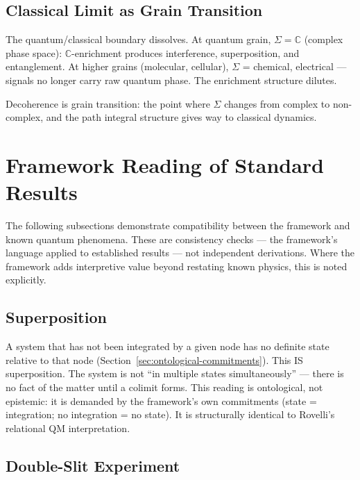 \documentclass[12pt,a4paper]{article}
\begin{document}
\subsection{Classical Limit as Grain Transition}
\label{sec:classical-limit}

The quantum/classical boundary dissolves. At quantum grain, $\Sigma = \mathbb{C}$ (complex phase space): $\mathbb{C}$-enrichment produces interference, superposition, and entanglement. At higher grains (molecular, cellular), $\Sigma$ = chemical, electrical --- signals no longer carry raw quantum phase. The enrichment structure dilutes.

Decoherence is grain transition: the point where $\Sigma$ changes from complex to non-complex, and the path integral structure gives way to classical dynamics.

\section{Framework Reading of Standard Results}
\label{sec:standard-results}

The following subsections demonstrate compatibility between the framework and known quantum phenomena. These are consistency checks --- the framework's language applied to established results --- not independent derivations. Where the framework adds interpretive value beyond restating known physics, this is noted explicitly.

\subsection{Superposition}
\label{sec:superposition}

A system that has not been integrated by a given node has no definite state relative to that node (Section~\ref{sec:ontological-commitments}). This IS superposition. The system is not ``in multiple states simultaneously'' --- there is no fact of the matter until a colimit forms. This reading is ontological, not epistemic: it is demanded by the framework's own commitments (state = integration; no integration = no state). It is structurally identical to Rovelli's relational QM interpretation.

\subsection{Double-Slit Experiment}
\label{sec:double-slit}
\end{document}
